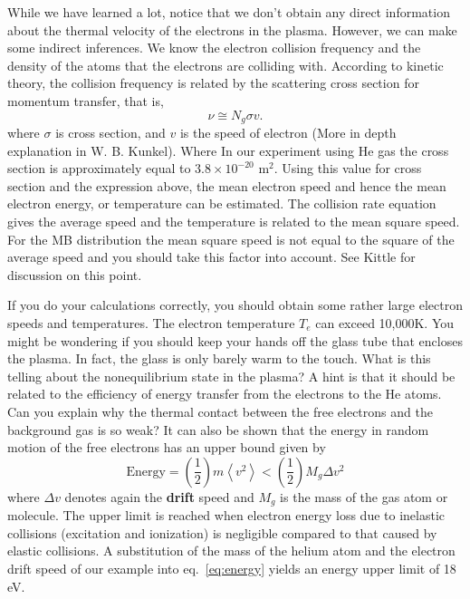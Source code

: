 \documentclass{../lab}
\begin{document}
While we have learned a lot, notice that we don't obtain any direct information about the thermal velocity of the electrons in the plasma. However, we can make some indirect inferences. We know the electron collision frequency and the density of the atoms that the electrons are colliding with. According to kinetic theory, the collision frequency is related by the scattering cross section for momentum transfer, that is,
\begin{equation}
    \nu \cong N_g \sigma v .
\end{equation}
where  \textbf{$\sigma$}  is cross section, and $v$ is the speed of electron (More in depth explanation in W. B. Kunkel). Where In our experiment using He gas the cross section is approximately equal to $3.8 \times 10^{-20}$ m$^2$. Using this value for cross section and the expression above, the mean electron speed and hence the mean electron energy, or temperature can be estimated. The collision rate equation gives the average speed and the temperature is related to the mean square speed. For the MB distribution the mean square speed is not equal to the square of the average speed and you should take this factor into account. See Kittle for discussion on this point.

If you do your calculations correctly, you should obtain some rather large electron speeds and temperatures. The electron temperature $T_e$ can exceed 10,000K. You might be wondering if you should keep your hands off the glass tube that encloses the plasma. In fact, the glass is only barely warm to the touch. What is this telling about the nonequilibrium state in the plasma? A hint is that it should be related to the efficiency of energy transfer from the electrons to the He atoms. Can you explain why the thermal contact between the free electrons and the background gas is so weak? It can also be shown that the energy in random motion of the free electrons has an upper bound given by
\begin{equation}
\label{eq:energy}
    \textrm{Energy} = \left ( \frac{1}{2} \right ) m \left \langle v^2 \right \rangle < \left ( \frac{1}{2} \right ) M_g \Delta v^2
\end{equation}
where $ \Delta v$ denotes again the \textbf{drift} speed and $M_g$ is the mass of the gas atom or molecule. The upper limit is reached when electron energy loss due to inelastic collisions (excitation and ionization) is negligible compared to that caused by elastic collisions. A substitution of the mass of the helium atom and the electron drift speed of our example into eq.~\eqref{eq:energy} yields an energy upper limit of 18 eV.
\end{document}
